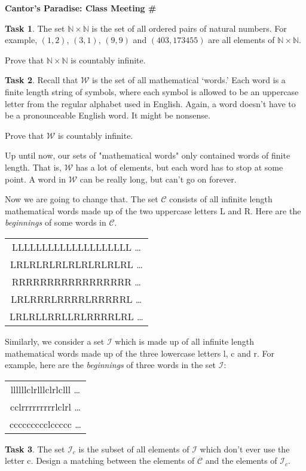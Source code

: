 \documentclass[12pt]{amsart}
\theoremstyle{definition}
\newtheorem{task}{Task}
\begin{document}
\begin{center}
\textbf{\Huge
Cantor's Paradise: Class Meeting \#
}
\end{center}

\vspace{.5in}

\begin{task} 
The set $\mathbb{N}\times\mathbb{N}$ is the set of all ordered pairs of natural numbers. For example, $(1,2)$, $(3,1)$, $(9,9)$ and $(403, 173455)$ are all elements of $\mathbb{N}\times\mathbb{N}$.

Prove that $\mathbb{N}\times\mathbb{N}$ is countably infinite.\\
\end{task}

\begin{task} Recall that $\mathcal{W}$ is the set of all mathematical `words.' 
Each word is a finite length string of symbols, where each symbol is allowed to be an uppercase letter from the regular alphabet used in English.
Again, a word doesn't have to be a pronounceable English word.
It might be nonsense.

Prove that $\mathcal{W}$ is countably infinite.
\end{task}

\hrulefill
\vspace{0.5in}

Up until now, our sets of "mathematical words" only contained words of finite length. That is, $\mathcal{W}$ has a lot of elements, but each word has to stop at some point. A word in $\mathcal{W}$ can be really long, but can't go on forever.

Now we are going to change that. The set $\mathcal{C}$ consists of all infinite length mathematical words made up of the two uppercase letters L and R. Here are the \emph{beginnings} of some words in $\mathcal{C}$.\\
\begin{center}
\begin{tabular}{c}
LLLLLLLLLLLLLLLLLLLL \dots \\[.2cm]
LRLRLRLRLRLRLRLRLRL \dots \\[.2cm]
RRRRRRRRRRRRRRRRR \dots \\[.2cm]
LRLRRRLRRRRLRRRRRL \dots \\[.2cm]
LRLRLLRRLLRLRRRRLRL \dots\\[.5cm]
\end{tabular}
\end{center}
Similarly, we consider a set $\mathcal{I}$ which is made up of all infinite length mathematical words made up of the three lowercase letters l, c and r. For example, here are the \emph{beginnings} of three words in the set $\mathcal{I}$:\\
\begin{center}
\begin{tabular}{c}
llllllclrlllclrlclll \dots \\[.2cm]
cclrrrrrrrrrlclrl \dots \\[.2cm]
ccccccccclccccc \dots \\[.5cm]
\end{tabular}
\end{center}


\begin{task}
The set $\mathcal{I}_c$ is the subset of all elements of $\mathcal{I}$ which don't ever use the letter c. Design a matching between the elements of $\mathcal{C}$ and the elements of $\mathcal{I}_c$.
\end{task}
\end{document}
